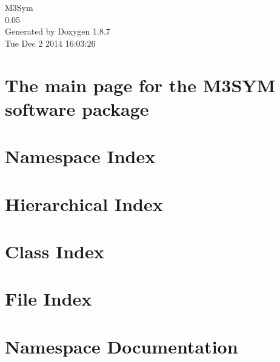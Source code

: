 \documentclass[twoside]{book}
\newcommand{\+}{\discretionary{\mbox{\scriptsize$\hookleftarrow$}}{}{}}
\newcommand{\clearemptydoublepage}{%
  \newpage{\pagestyle{empty}\cleardoublepage}%
}
\begin{document}
\hypersetup{pageanchor=false,
             bookmarks=true,
             bookmarksnumbered=true,
             pdfencoding=unicode
            }
\begin{titlepage}
\vspace*{7cm}
\begin{center}%
{\Large M3\+Sym \\[1ex]\large 0.\+05 }\\
\vspace*{1cm}
{\large Generated by Doxygen 1.8.7}\\
\vspace*{0.5cm}
{\small Tue Dec 2 2014 16:03:26}\\
\end{center}
\end{titlepage}
\clearemptydoublepage
\tableofcontents
\clearemptydoublepage
{}
\hypersetup{pageanchor=true}

\chapter{The main page for the M3\+S\+Y\+M software package}
\label{index}\hypertarget{index}{}
\chapter{Namespace Index}

\chapter{Hierarchical Index}

\chapter{Class Index}

\chapter{File Index}

\chapter{Namespace Documentation}



\end{document}
